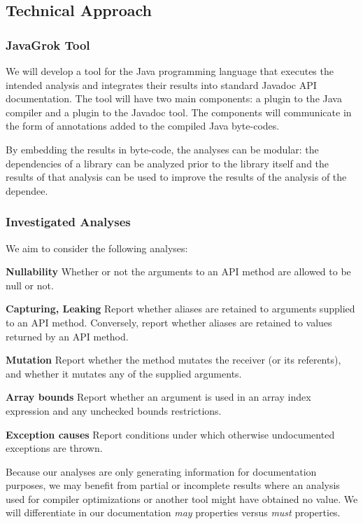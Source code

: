 \documentclass[letterpaper,12pt]{article}
\let\Itemize =\itemize
\def\Nospacing{\itemsep=0pt\topsep=0pt\partopsep=0pt\parskip=0pt\parsep=0pt}
\renewenvironment{itemize}{\Itemize\Nospacing}{\endlist}
\begin{document}
\subsection*{Technical Approach}
\subsubsection*{JavaGrok Tool}
We will develop a tool for the Java programming language that executes the
intended analysis and integrates their results into standard Javadoc API
documentation. The tool will have two main components: a plugin to the Java
compiler and a plugin to the Javadoc tool. The components will communicate in
the form of annotations added to the compiled Java byte-codes.

By embedding the results in byte-code, the analyses can be modular: the
dependencies of a library can be analyzed prior to the library itself and the
results of that analysis can be used to improve the results of the analysis of
the dependee.

\subsubsection*{Investigated Analyses}
We aim to consider the following analyses:

\begin{itemize}
\item \textbf{Nullability} Whether or not the arguments to an API method are
  allowed to be null or not.

\item \textbf{Capturing, Leaking} Report whether aliases are retained to
  arguments supplied to an API method. Conversely, report whether aliases are
  retained to values returned by an API method.

\item \textbf{Mutation} Report whether the method mutates the receiver (or its
  referents), and whether it mutates any of the supplied arguments.

\item \textbf{Array bounds} Report whether an argument is used in an array
  index expression and any unchecked bounds restrictions.

\item \textbf{Exception causes} Report conditions under which otherwise
  undocumented exceptions are thrown.
\end{itemize}

Because our analyses are only generating information for documentation
purposes, we may benefit from partial or incomplete results where an analysis
used for compiler optimizations or another tool might have obtained no
value. We will differentiate in our documentation \textit{may} properties
versus \textit{must} properties.
\end{document}
